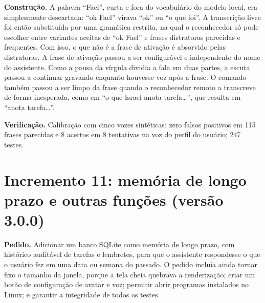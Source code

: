 \textbf{Construção.} A palavra “Fael”, curta e fora do vocabulário do modelo local, era simplesmente
descartada: “ok Fael” virava “ok” ou “o que foi”. A transcrição livre foi então substituída por uma
gramática restrita, na qual o reconhecedor só pode escolher entre variantes aceitas de “ok Fael” e
frases distratoras parecidas e frequentes. Com isso, o que não é a frase de ativação é absorvido pelas
distratoras. A frase de ativação passou a ser configurável e independente do nome do assistente. Como a
pausa da vírgula dividia a fala em duas partes, a escuta passou a continuar gravando enquanto houvesse
voz após a frase. O comando também passou a ser limpo da frase quando o reconhecedor remoto a transcreve
de forma inesperada, como em “o que Israel anota tarefa…”, que resulta em “anota tarefa…”.

\textbf{Verificação.} Calibração com cinco vozes sintéticas: zero falsos positivos em 115 frases
parecidas e 8 acertos em 8 tentativas na voz do perfil do usuário; 247 testes.

\section{Incremento 11: memória de longo prazo e outras funções (versão 3.0.0)}

\textbf{Pedido.} Adicionar um banco SQLite como memória de longo prazo, com histórico auditável de
tarefas e lembretes, para que o assistente respondesse o que o usuário fez em uma data ou semana do
passado. O pedido incluía ainda tornar fixo o tamanho da janela, porque a tela cheia quebrava a
renderização; criar um botão de configuração de avatar e voz; permitir abrir programas instalados no
Linux; e garantir a integridade de todos os testes.

